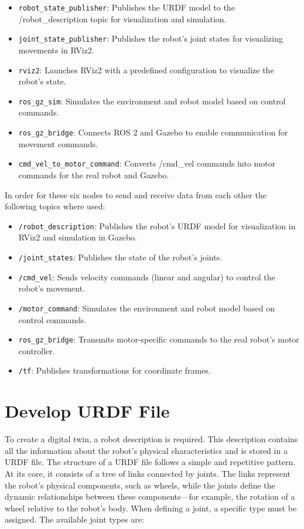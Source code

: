 \begin{itemize}
    \item \verb|robot_state_publisher|: Publishes the URDF model to the /robot\_description topic for visualization and simulation.
    \item \verb|joint_state_publisher|: Publishes the robot's joint states for visualizing movements in RViz2.
    \item \verb|rviz2|: Launches RViz2 with a predefined configuration to visualize the robot's state.
    \item \verb|ros_gz_sim|: Simulates the environment and robot model based on control commands.
    \item \verb|ros_gz_bridge|: Connects ROS 2 and Gazebo to enable communication for movement commands.
    \item \verb|cmd_vel_to_motor_command|: Converts /cmd\_vel commands into motor commands for the real robot and Gazebo.
\end{itemize}

In order for these six nodes to send and receive data from each other the following topics where used:

\begin{itemize}
    \item \verb|/robot_description|: Publishes the robot's URDF model for visualization in RViz2 and simulation in Gazebo.
    \item \verb|/joint_states|: Publishes the state of the robot's joints.
    \item \verb|/cmd_vel|: Sends velocity commands (linear and angular) to control the robot's movement.
    \item \verb|/motor_command|: Simulates the environment and robot model based on control commands.
    \item \verb|ros_gz_bridge|: Transmits motor-specific commands to the real robot's motor controller.
    \item \verb|/tf|: Publishes transformations for coordinate frames.
\end{itemize}



\section{Develop URDF File}

To create a digital twin, a robot description is required. This description contains all the information about the robot's physical characteristics and is stored in a URDF file. The structure of a URDF file follows a simple and repetitive pattern. At its core, it consists of a tree of links connected by joints. The links represent the robot's physical components, such as wheels, while the joints define the dynamic relationships between these components—for example, the rotation of a wheel relative to the robot's body.
When defining a joint, a specific type must be assigned. The available joint types are:

